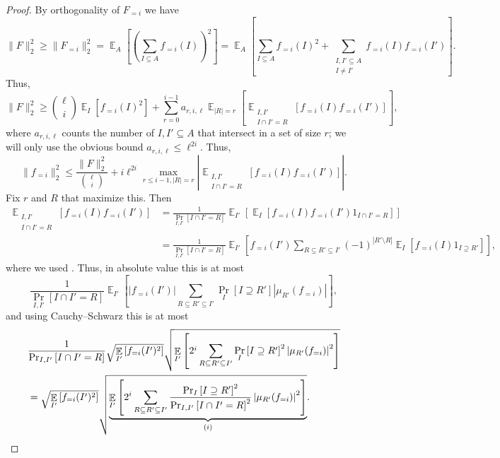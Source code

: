 \documentclass{toc}
\newcommand{\rom}[1]{\uppercase\expandafter{\romannumeral #1\relax}}
\newcommand\card[1]{\left| {#1} \right|}
\newcommand\Prob[2]{{\Pr_{#1}\left[ {#2} \right]}}
\newcommand\Expect[2]{{\mathop{\mathbb{E}}_{#1}\left[ {#2} \right]}}
\newcommand\norm[1]{\| #1 \|}
\renewcommand\geq{\geqslant}
\renewcommand\leq{\leqslant}
\newcommand\lvlfn[2]{{#1}_{={#2}}}
\begin{document}
\begin{proof}
  By orthogonality of $\lvlfn{F}{i}$ we have %
  \[
  \norm{F}_2^2
  \geq \norm{\lvlfn{F}{i}}_2^2
  = \Expect{A}{\left(\sum\limits_{I\subseteq A}{\lvlfn{f}{i}(I)}\right)^2}
  = \Expect{A}{\sum\limits_{I\subseteq A}{\lvlfn{f}{i}(I)^2} + \sum\limits_{\substack{I,I'\subseteq A\\ I\neq I'}}\lvlfn{f}{i}(I)\lvlfn{f}{i}(I')}.
  \]
  Thus,
  \[
  \norm{F}_2^2
  \geq
  \binom{\ell}{i}\Expect{I}{\lvlfn{f}{i}(I)^2}
  +\sum\limits_{r=0}^{i-1}a_{r,i,\ell}
  \Expect{\card{R} = r}{\Expect{\substack{I,I'\\ I\cap I' = R}}{\lvlfn{f}{i}(I)\lvlfn{f}{i}(I')}},
  \]
  where $a_{r,i,\ell}$ counts the number of $I,I'\subseteq A$ that intersect in a set of size $r$; we will only use the obvious
  bound $a_{r,i,\ell}\leq \ell^{2i}$. Thus,
  \begin{equation}\label{eq:mock_parseval}
  \norm{\lvlfn{f}{i}}_2^2
  \leq \frac{\norm{F}_2^2}{\binom{\ell}{i}}
  +i\ell^{2i}\max_{r\leq i-1, \card{R}=r}\card{\Expect{\substack{I,I'\\ I\cap I' = R}}{\lvlfn{f}{i}(I)\lvlfn{f}{i}(I')}}.
  \end{equation}
  Fix $r$ and $R$ that maximize this. Then
  \begin{align*}
  \Expect{\substack{I,I'\\ I\cap I' = R}}{\lvlfn{f}{i}(I)\lvlfn{f}{i}(I')}
  &=\frac{1}{\Prob{I,I'}{I\cap I' = R}}\Expect{I'}{\Expect{I}{\lvlfn{f}{i}(I)\lvlfn{f}{i}(I')1_{I\cap I' = R}}}\\
  &=\frac{1}{\Prob{I,I'}{I\cap I' = R}}\Expect{I'}{\lvlfn{f}{i}(I')\sum\limits_{R\subseteq R'\subseteq I'}(-1)^{\card{R'\setminus R}}\Expect{I}{\lvlfn{f}{i}(I)1_{I \supseteq R'}}},
  \end{align*}
  where we used . Thus, in absolute value this is at most
  \[
  \frac{1}{\Prob{I,I'}{I\cap I' = R}}\Expect{I'}{\card{\lvlfn{f}{i}(I')}\sum\limits_{R\subseteq R'\subseteq I'}\Prob{I}{I\supseteq R'}\card{\mu_{R'}(\lvlfn{f}{i})}},
  \]
  and using %
Cauchy--Schwarz   %
this is at most
  \begin{align*}
  &\frac{1}{\Prob{I,I'}{I\cap I' = R}}\sqrt{\Expect{I'}{\lvlfn{f}{i}(I')^2}}
  \sqrt{\Expect{I'}{2^{i}\sum\limits_{R\subseteq R'\subseteq I'}\Prob{I}{I\supseteq R'}^2\card{\mu_{R'}(\lvlfn{f}{i})}^2}}\\
  &=
  \sqrt{\Expect{I'}{\lvlfn{f}{i}(I')^2}}
  \sqrt{\underbrace{\Expect{I'}{2^{i}\sum\limits_{R\subseteq R'\subseteq I'}\frac{\Prob{I}{I\supseteq R'}^2}{\Prob{I,I'}{I\cap I' = R}^2}\card{\mu_{R'}(\lvlfn{f}{i})}^2}}_{(\rom{1})}}.

\end{align*}
\end{proof}
\end{document}
